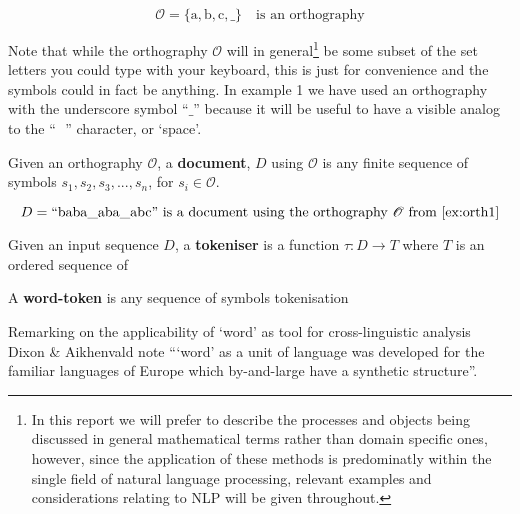 \begin{example}\label{ex:orth1}
  \begin{equation}
    \mathscr{O}=\{\mathrm{a},\mathrm{b},\mathrm{c},\mathrm{\_}\}\quad\text{is an orthography}
  \end{equation}
\end{example}

Note that while the orthography \(\mathscr{O}\) will in general\footnote{In this report we will prefer to describe the processes and objects being discussed in general mathematical terms rather than domain specific ones, however, since the application of these methods is predominatly within the single field of natural language processing, relevant examples and considerations relating to NLP will be given throughout.} be some subset of the set letters you could type with your keyboard, this is just for convenience and the symbols could in fact be anything. In example 1 we have used an orthography with the underscore symbol ``\(\mathrm{\_}\)'' because it will be useful to have a visible analog to the ``\(\texttt{ }\)'' character, or `space'.

\begin{definition}
  Given an orthography \(\mathscr{O}\), a \textbf{document}, \(D\) using \(\mathscr{O}\) is any finite sequence of symbols \(s_1,s_2,s_3,...,s_n\), for \(s_i\in \mathscr{O}\).
\end{definition}

\begin{example}
  \begin{equation}
    D=``\mathrm{baba\_aba\_abc}"\ \text{is a document using the orthography $\mathscr{O}$ from \autoref{ex:orth1}}
  \end{equation}
\end{example}


\begin{definition}
  Given an input sequence \(D\), a \textbf{tokeniser} is a function \(\tau:D\to T\) where \(T\) is an ordered sequence of 
\end{definition}

\begin{definition}
  A \textbf{word-token} is any sequence of symbols  tokenisation 
\end{definition}

Remarking on the applicability of `word' as tool for cross-linguistic analysis Dixon \& Aikhenvald note ```word' as a unit of language was developed for the familiar languages of Europe which by-and-large have a synthetic structure''.

